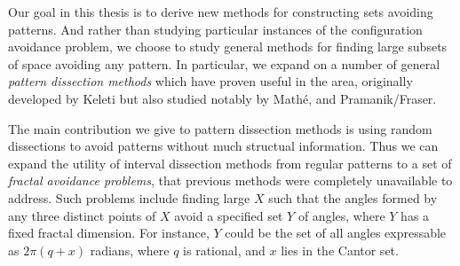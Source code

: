Our goal in this thesis is to derive new methods for constructing sets avoiding patterns. And rather than studying particular instances of the configuration avoidance problem, we choose to study general methods for finding large subsets of space avoiding any pattern. In particular, we expand on a number of general {\it pattern dissection methods} which have proven useful in the area, originally developed by Keleti but also studied notably by Math\'{e}, and Pramanik/Fraser.

The main contribution we give to pattern dissection methods is using random dissections to avoid patterns without much structual information. Thus we can expand the utility of interval dissection methods from regular patterns to a set of {\it fractal avoidance problems}, that previous methods were completely unavailable to address. Such problems include finding large $X$ such that the angles formed by any three distinct points of $X$ avoid a specified set $Y$ of angles, where $Y$ has a fixed fractal dimension. For instance, $Y$ could be the set of all angles expressable as $2\pi(q + x)$ radians, where $q$ is rational, and $x$ lies in the Cantor set.

\endinput

Any text after an \endinput is ignored.
You could put scraps here or things in progress.